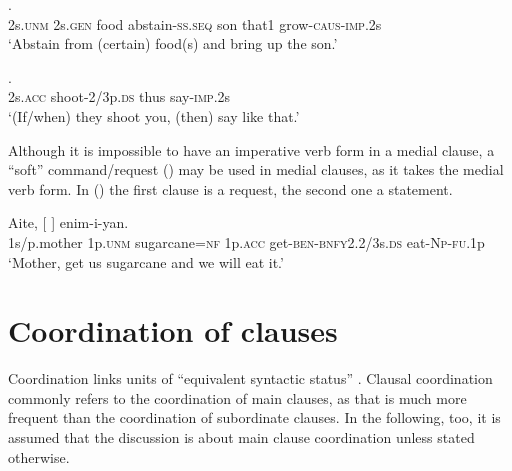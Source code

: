 \ea%
\label{ex:x1365}
     .\\
2s.\textsc{unm}  2s.\textsc{gen}  food  abstain-\textsc{ss}.\textsc{seq}  son  that1 grow-\textsc{caus}-\textsc{imp}.2s\\
\glt `Abstain from (certain) food(s) and bring up the son.'  
\z


\ea%
\label{ex:x1356}
    . \\
2s.\textsc{acc}  shoot-2/3p.\textsc{ds}  thus  say-\textsc{imp}.2s      \\
\glt `(If/when) they shoot you, (then) say like that.'
\z

Although it is impossible to have an imperative verb form in a medial clause, a ``soft'' command/request () may be used in medial clauses, as it takes the medial verb form. In () the first clause is a request, the second one a statement.

\ea%
\label{ex:x1366}
\gll Aite,  [      ] enim-i-yan. \\
1s/p.mother  1p.\textsc{unm}  sugarcane=\textsc{\textsc{nf}}  1p.\textsc{acc}  get-\textsc{ben}-\textsc{bnfy}2.2/3s.\textsc{ds} eat-\textsc{Np}-\textsc{fu}.1p\\
\glt `Mother, get us sugarcane and we will eat it.'
\z

\section{Coordination of clauses}

Coordination links units of ``equivalent syntactic status'' \citep[93]{Crystal1997}. Clausal coordination commonly refers to the coordination of main clauses, as that is much more frequent than the coordination of subordinate clauses. In the following, too, it is assumed that the discussion is about main clause coordination unless stated otherwise.

